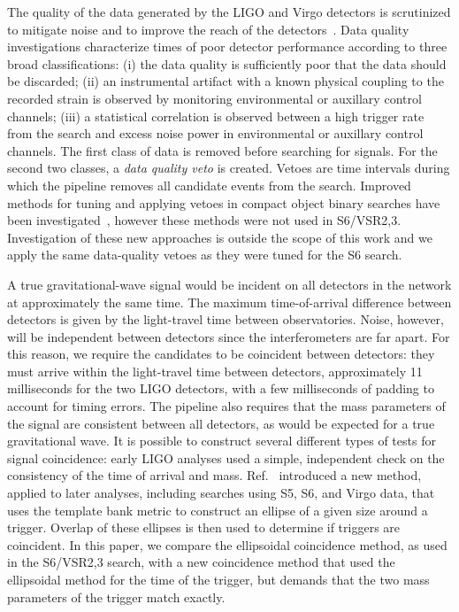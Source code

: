 \documentclass[12pt]{iopart} \usepackage{graphicx,amssymb}
\begin{document}
The quality of the data generated by the LIGO and Virgo detectors is
scrutinized to mitigate noise and to improve the reach of the 
detectors~\cite{Aasi:2012wd,Aasi:2014mqd}. Data
quality investigations characterize times of poor detector performance
according to three broad classifications: (i) the data quality is sufficiently
poor that the data should be discarded; (ii) an instrumental artifact with a
known physical coupling to the recorded strain is observed by monitoring
environmental or auxillary control channels; (iii) a statistical correlation
is observed between a high trigger rate from the search and excess noise power
in environmental or auxillary control channels. The first class of data is
removed before searching for signals. For the second two classes, a \emph{data
quality veto} is created. Vetoes are time intervals during
which the pipeline removes all candidate events from the search.
Improved methods for tuning and applying vetoes in compact object binary
searches have been investigated~\cite{Canton:2013joa}, however these methods
were not used in S6/VSR2,3. Investigation of these new approaches is outside
the scope of this work and we apply the same data-quality vetoes as
they were tuned for the S6 search.

A true gravitational-wave signal would be incident on all detectors in the network at
approximately the same time. The maximum time-of-arrival difference between
detectors is given by the light-travel time between observatories. Noise,
however, will be independent between detectors since the interferometers
are far apart. For this reason, we require the candidates to be coincident
between detectors: they must arrive within the light-travel time between detectors,
approximately 11 milliseconds for the two LIGO detectors, with
a few milliseconds of padding to account for timing errors. The pipeline also
requires that the mass parameters of the signal are consistent between all
detectors, as would be expected for a true gravitational wave. 
It is possible to construct several different types of tests for
signal coincidence: early LIGO analyses used a simple, independent check on
the consistency of the time of arrival and mass. Ref.~\cite{Robinson:2008un}
introduced a new method, applied to later analyses, including searches using S5, 
S6, and Virgo data, that uses
the template bank metric to construct an ellipse of a given size around a
trigger. Overlap of these ellipses is then used to determine if triggers are coincident. In this
paper, we compare the ellipsoidal coincidence method, as used in the S6/VSR2,3 search,
with a new coincidence method that used the
ellipsoidal method for the time of the trigger, but demands that the two mass
parameters of the trigger match exactly.
\end{document}
